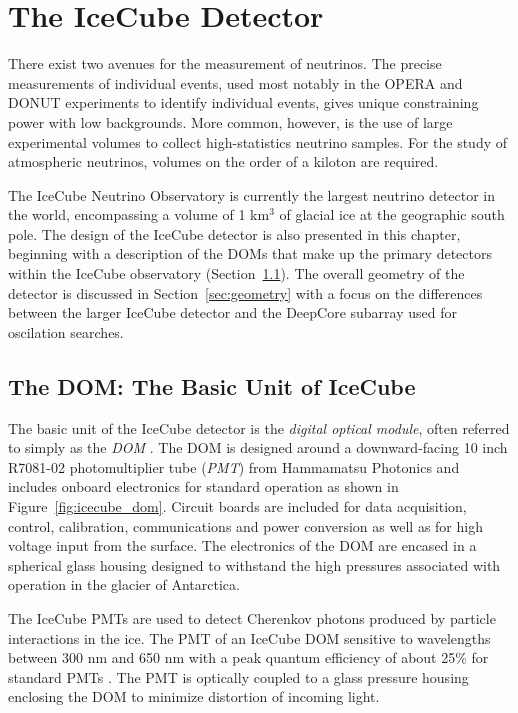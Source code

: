 \graphicspath{{chapters/detector/images/}}
\chapter{The IceCube Detector}
\label{chapter:detector}
There exist two avenues for the measurement of neutrinos.
The precise measurements of individual events, used most notably in the OPERA \cite{Description-OPERA} and DONUT \cite{DONUT-2001} experiments to identify individual events, gives unique constraining power with low backgrounds.
More common, however, is the use of large experimental volumes to collect high-statistics neutrino samples.
For the study of atmospheric neutrinos, volumes on the order of a kiloton are required. 

The IceCube Neutrino Observatory is currently the largest neutrino detector in the world, encompassing a volume of 1 km$^3$ of glacial ice at the geographic south pole.
The design of the IceCube detector is also presented in this chapter, beginning with a description of the DOMs that make up the primary detectors within the IceCube observatory (Section~\ref{sec:dom}).
The overall geometry of the detector is discussed in Section~\ref{sec:geometry} with a focus on the differences between the larger IceCube detector and the DeepCore subarray used for oscilation searches.

\section{The DOM: The Basic Unit of IceCube}
\label{sec:dom}

The basic unit of the IceCube detector is the \emph{digital optical module}, often referred to simply as the \emph{DOM} \cite{Description-IceCube}.
The DOM is designed around a downward-facing 10 inch R7081-02 photomultiplier tube (\emph{PMT}) from Hammamatsu Photonics \cite{IceCube-PMT,IceCube-PMT-Hammamatsu} and includes onboard electronics for standard operation as shown in Figure~\ref{fig:icecube_dom}. 
Circuit boards are included for data acquisition, control, calibration, communications and power conversion as well as for high voltage input from the surface.
The electronics of the DOM are encased in a spherical glass housing designed to withstand the high pressures associated with operation in the glacier of Antarctica.

The IceCube PMTs are used to detect Cherenkov photons produced by particle interactions in the ice.
The PMT of an IceCube DOM sensitive to wavelengths between 300 nm and 650 nm with a peak quantum efficiency of about 25\% for standard PMTs \cite{Description-IceCube}.
The PMT is optically coupled to a glass pressure housing enclosing the DOM to minimize distortion of incoming light.

